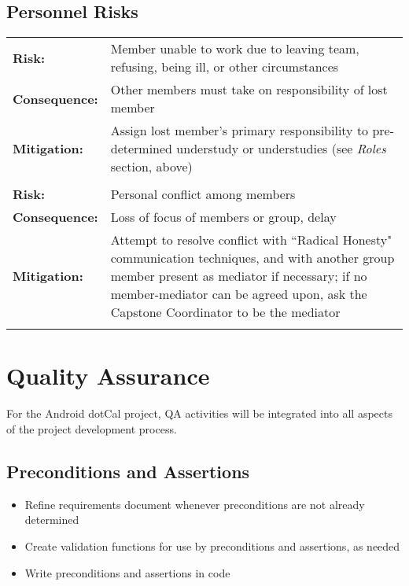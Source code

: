 \documentclass[11pt]{article}
\begin{document}
	\subsection{Personnel Risks}

		\begin{tabular}{lp{118mm}}\\
		{\bf Risk:}        & Member unable to work due to leaving team, refusing, being ill, or other circumstances\\
		{\bf Consequence:} & Other members must take on responsibility of lost member\\
		{\bf Mitigation:}  & Assign lost member's primary responsibility to pre-determined understudy or understudies (see {\em Roles} section, above)\\\\

		{\bf Risk:}        & Personal conflict among members\\
		{\bf Consequence:} & Loss of focus of members or group, delay\\
		{\bf Mitigation:}  & Attempt to resolve conflict with ``Radical Honesty" communication techniques, and with another group member present as mediator if necessary; if no member-mediator can be agreed upon, ask the Capstone Coordinator to be the mediator\\\\
		\end{tabular}

\section{Quality Assurance}

For the Android dotCal project, QA activities will be integrated into all aspects of the project development process.

\subsection{Preconditions and Assertions}

\begin{itemize}
\item Refine requirements document whenever preconditions are not already determined
\item Create validation functions for use by preconditions and assertions, as needed
\item Write preconditions and assertions in code
\end{itemize}
\end{document}
